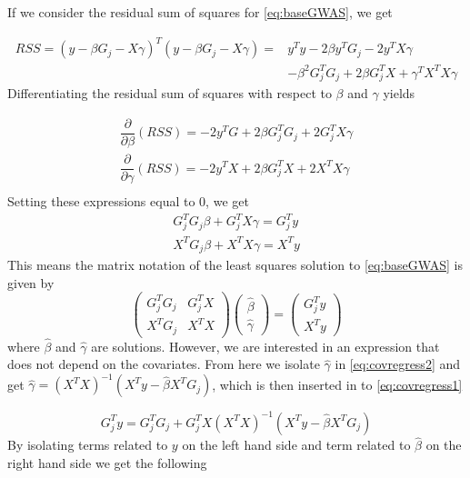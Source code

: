 If we consider the residual sum of squares for \cref{eq:baseGWAS}, we get 

\begin{align}
RSS = \left( y - \beta G_j - X\gamma \right)^T\left( y - \beta G_j - X\gamma \right) = &y^T y - 2\beta y^T G_j - 2y^TX\gamma \\
&- \beta^2 G_j^TG_j + 2\beta G_j^T X + \gamma^T X^T X \gamma
\end{align}
Differentiating the residual sum of squares with respect to $ \beta $ and $ \gamma $ yields

\begin{align}
\dfrac{\partial}{\partial \beta} (RSS) = -2y^TG + 2\beta G_j^TG_j + 2G_j^T X\gamma \\
\dfrac{\partial}{\partial \gamma} (RSS)  = -2y^TX + 2\beta G^T_j X + 2X^TX\gamma  \\ 
\end{align}
Setting these expressions equal to $ 0 $, we get
\begin{align}
G_j^T G_j \beta +  G_j^T X \gamma =  G_j^T y  \label{eq:covregress1}\\ 
X^T G_j \beta + X^T X \gamma =  X^Ty \label{eq:covregress2}
\end{align}
This means the matrix notation of the least squares solution to \cref{eq:baseGWAS} is given by 
\begin{equation}
\begin{pmatrix}
G_j^T G_j & G_j^T X \\
X^T G_j & X^T X
\end{pmatrix}
\begin{pmatrix}
\hat{\beta} \\
\hat{\gamma}
\end{pmatrix} = 
\begin{pmatrix}
G_j^T y \\
X^T y
\end{pmatrix}
\end{equation}
where $ \hat{\beta} $ and $ \hat{\gamma} $ are solutions. However, we are interested in an expression that does not depend on the covariates. From here we isolate $ \hat{\gamma} $ in \cref{eq:covregress2} and get $ \hat{\gamma} = (X^TX)^{-1}(X^Ty - \hat{\beta} X^TG_j) $, which is then inserted in to \cref{eq:covregress1} 

\begin{equation}
G^T_j y = G_j^TG_j + G_j^TX (X^TX)^{-1}(X^Ty - \hat{\beta} X^TG_j)
\end{equation}
By isolating terms related to $ y $ on the left hand side and term related to $ \hat{\beta} $ on the right hand side we get the following

